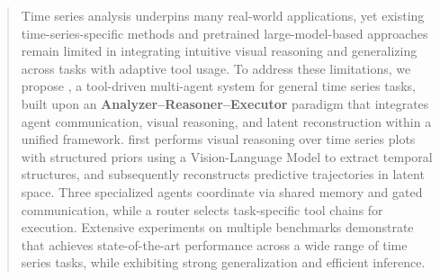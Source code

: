 \begin{abstract}
Time series analysis underpins many real-world applications, yet existing time-series-specific methods and pretrained large-model-based approaches remain limited in integrating intuitive visual reasoning and generalizing across tasks with adaptive tool usage.
To address these limitations, we propose \textbf{\model}, a tool-driven multi-agent system for general time series tasks, built upon an \textbf{Analyzer--Reasoner--Executor} paradigm that integrates agent communication, visual reasoning, and latent reconstruction within a unified framework.
\model first performs visual reasoning over time series plots with structured priors using a Vision-Language Model to extract temporal structures, and subsequently reconstructs predictive trajectories in latent space.
Three specialized agents coordinate via shared memory and gated communication, while a router selects task-specific tool chains for execution.
Extensive experiments on multiple benchmarks demonstrate that \model achieves state-of-the-art performance across a wide range of time series tasks, while exhibiting strong generalization and efficient inference.
\end{abstract}
